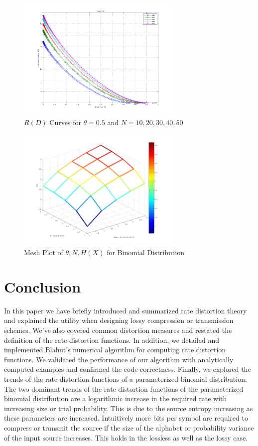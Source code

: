 \documentclass[journal]{IEEEtran}
\begin{document}
\begin{figure}[!h]
\centering
\includegraphics[width=3.1in]{../images/plot_5.png}
\caption{\(R(D)\) Curves for \(\theta=0.5\) and \(N={ {10,20,30,40,50} }\)}
\label{fig:theta_5}
\end{figure}

\begin{figure}[!h]
\centering
\includegraphics[width=3.1in]{../images/3d.png}
\caption{Mesh Plot of \(\theta,N,H(X)\) for Binomial Distribution}
\label{fig:3d}
\end{figure}

\section{Conclusion}
\par In this paper we have briefly introduced and summarized rate distortion theory and explained the utility when designing lossy compression or transmission schemes. We've also covered common distortion measures and restated the definition of the rate distortion functions. In addition, we detailed and implemented Blahut's numerical algorithm for computing rate distortion functions. We validated the performance of our algorithm with analytically computed examples and confirmed the code correctness. Finally, we explored the trends of the rate distortion functions of a parameterized binomial distribution. The two dominant trends of the rate distortion functions of the parameterized binomial distribution are a logarithmic increase in the required rate with increasing size or trial probability. This is due to the source entropy increasing as these parameters are increased. Intuitively more bits per symbol are required to compress or transmit the source if the size of the alphabet or probability variance of the input source increases. This holds in the lossless as well as the lossy case.
\end{document}
